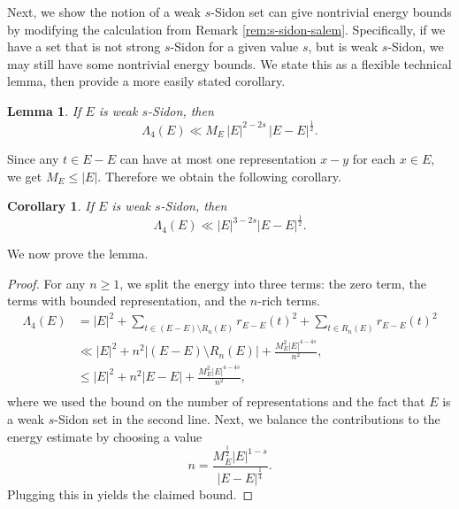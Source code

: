 \documentclass{article}
\newtheorem{corollary}[theorem]{Corollary}
\newtheorem{lemma}[theorem]{Lemma}
\def\dung#1{\noindent
\textcolor{magenta}
{\textsc{(Dung:}
\textsf{#1})}}
\begin{document}
Next, we show the notion of a weak $s$-Sidon set can give nontrivial energy bounds by modifying the calculation from Remark \ref{rem:s-sidon-salem}. Specifically, if we have a set that is not strong $s$-Sidon for a given value $s$, but is weak $s$-Sidon, we may still have some nontrivial energy bounds. We state this as a flexible technical lemma, then provide a more easily stated corollary.


\begin{lemma}\label{lem:weak-tech}
    If $E$ is weak $s$-Sidon, then
    \[\Lambda_4(E)\ll M_E \, |E|^{2-2s} \, |E-E|^\frac{1}{2}.\]
\end{lemma}

Since any $t\in E-E$ can have at most one representation $x-y$ for each $x\in E,$ we get $M_E\leq |E|.$ Therefore we obtain the following corollary.

\begin{corollary}\label{cor:weak-tech}
    If $E$ is weak $s$-Sidon, then
    \[\Lambda_4(E)\ll |E|^{3-2s}|E-E|^\frac{1}{2}.\]
\end{corollary}
 We now prove the lemma.

\begin{proof}
    For any $n\geq 1$, we split the energy into three terms: the zero term, the terms with bounded representation, and the $n$-rich terms.
    \begin{align*}
        \Lambda_4(E) &= |E|^2 + \sum_{t\in (E-E)\setminus R_n(E)}r_{E-E}(t)^2 + \sum_{t\in R_n(E)}r_{E-E}(t)^2\\
        &\ll |E|^2 + n^2 |(E-E)\setminus R_n(E)| + \frac{M_E^2|E|^{4-4s}}{n^2},\\
        &\leq |E|^2 + n^2 |E-E| + \frac{M_E^2|E|^{4-4s}}{n^2},\\
    \end{align*}
    where we used the bound on the number of representations and the fact that $E$ is a weak $s$-Sidon set in the second line. Next, we balance the contributions to the energy estimate by choosing a value
    \[n = \frac{M_E^\frac{1}{2}|E|^{1-s}}{|E-E|^\frac{1}{4}}.\]
    Plugging this in yields the claimed bound.
\end{proof}
\end{document}
